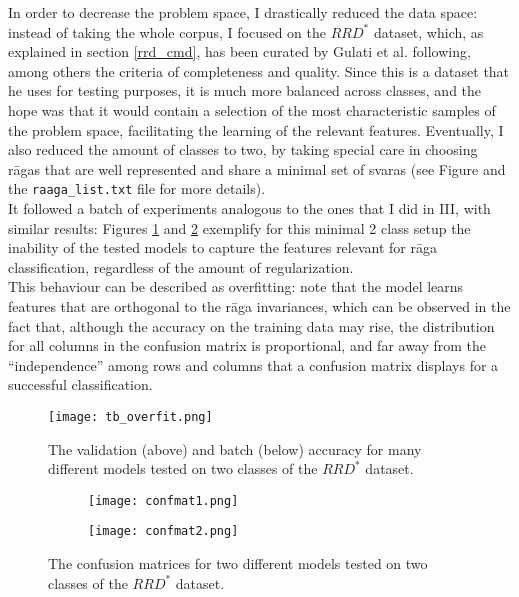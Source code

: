 In order to decrease the problem space, I drastically reduced the data space: instead of taking the whole corpus, I focused on the \(RRD^*\) dataset, which, as explained in section \ref{rrd_cmd}, has been curated by Gulati et al. following, among others the criteria of completeness and quality. Since this is a dataset that he uses for testing purposes, it is much more balanced across classes, and the hope was that it would contain a selection of the most characteristic samples of the problem space, facilitating the learning of the relevant features. Eventually, I also reduced the amount of classes to two, by taking special care in choosing r\=agas that are well represented and share a minimal set of svaras (see Figure \label{fig:rrd-ragasvaras} and the \texttt{raaga\_list.txt} file for more details).\\

It followed a batch of experiments analogous to the ones that I did in III, with similar results: Figures \ref{fig:tb-overfit} and \ref{fig:confmatrices} exemplify for this minimal 2 class setup the inability of the tested models to capture the features relevant for r\=aga classification, regardless of the amount of regularization.\\

This behaviour can be described as overfitting: note that the model learns features that are orthogonal to the r\=aga invariances, which can be observed in the fact that, although the accuracy on the training data may rise, the distribution for all columns in the confusion matrix is proportional, and far away from the ``independence'' among rows and columns that a confusion matrix displays for a successful classification.


\begin{figure}[h]
  \centering
  \texttt{[image: tb\_overfit.png]}
  \caption{The validation (above) and batch (below) accuracy for many different models tested on two classes of the \(RRD^*\) dataset.}
  \label{fig:tb-overfit}
\end{figure}




\begin{figure}
  \centering
  \begin{subfigure}[b]{0.48\textwidth}
    \centering
    \texttt{[image: confmat1.png]}
  \end{subfigure}
  \hfill
  \begin{subfigure}[b]{0.48\textwidth}
    \centering
    \texttt{[image: confmat2.png]}
  \end{subfigure}
  \hfill
  \caption{The confusion matrices for two different models tested on two classes of the \(RRD^*\) dataset.}
  \label{fig:confmatrices}
\end{figure}
